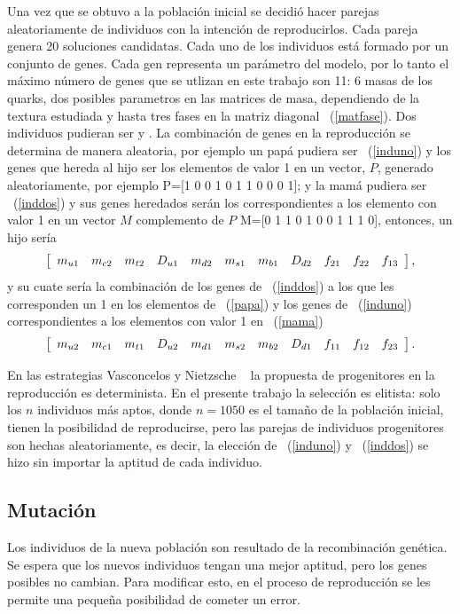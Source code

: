 Una vez que se obtuvo a la poblaci\'on inicial se decidi\'o hacer parejas 
aleatoriamente de individuos con la intenci\'on de reproducirlos. Cada pareja
genera 20 soluciones candidatas. Cada uno de los individuos est\'a formado por 
un conjunto de genes. Cada gen representa un par\'ametro del modelo, por lo 
tanto el m\'aximo n\'umero de genes que se utlizan en este trabajo son 11: 6
masas de los quarks, dos posibles parametros en las matrices de masa, 
dependiendo de la textura estudiada y hasta tres fases en la matriz diagonal
~(\ref{matfase}). Dos individuos pudieran ser
\be\label{induno}
\ee
y
\be\label{inddos}
.
\ee
La combinaci\'on de genes en la reproducci\'on se determina de
manera aleatoria, por ejemplo un pap\'a pudiera ser ~(\ref{induno}) y los genes
que hereda al hijo ser los elementos de valor 1 en un vector, $P$, generado
aleatoriamente, por ejemplo
\be\label{papa}
P=[1 0 0 1 0 1 1 0 0 0 1];
\ee
y la mam\'a pudiera ser ~(\ref{inddos}) y sus genes heredados ser\'an los
correspondientes a los elemento con valor 1 en un vector $M$ complemento de $P$
\be\label{mama}
M=[0 1 1 0 1 0 0 1 1 1 0],
\ee
entonces, un hijo ser\'ia
$$
\left[\ba{ccccccccccc}
m_{u1}&m_{c2}&m_{t2}&D_{u1}&m_{d2}&m_{s1}&m_{b1}&D_{d2}&f_{21}&f_{22}&f_{13}
\ea\right],
$$
y su cuate ser\'ia la combinaci\'on de los genes de ~(\ref{inddos}) a los que 
les corresponden un 1 en los elementos de ~(\ref{papa}) y los genes de
~(\ref{induno}) correspondientes a los elementos con valor 1 en ~(\ref{mama})
$$
\left[\ba{ccccccccccc}
m_{u2}&m_{c1}&m_{t1}&D_{u2}&m_{d1}&m_{s2}&m_{b2}&D_{d1}&f_{11}&f_{12}&f_{23}
\ea\right].
$$

En las estrategias Vasconcelos y Nietzsche ~\cite{Kur199901} la propuesta de
progenitores en la reproducci\'on es determinista. En el presente trabajo la
selecci\'on es elitista: solo los $n$ individuos m\'as aptos, donde $n=1050$ es
el tama\~no de la poblaci\'on inicial, tienen la posibilidad de reproducirse,
pero las parejas de individuos progenitores son hechas aleatoriamente, es decir,
la elecci\'on de ~(\ref{induno}) y ~(\ref{inddos}) se hizo sin importar la
aptitud de cada individuo.

\subsection{Mutaci\'on}
Los individuos de la nueva poblaci\'on son resultado de la recombinaci\'on 
gen\'etica. Se espera que los nuevos individuos tengan una mejor aptitud, pero
los genes posibles no cambian. Para modificar esto, en el proceso de 
reproducci\'on se les permite una peque\~na posibilidad de cometer un error.

